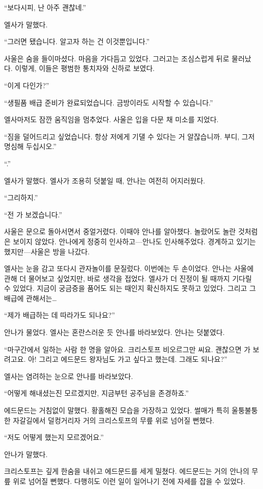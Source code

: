 ``보다시피, 난 아주 괜찮네.''

엘사가 말했다.

``그러면 됐습니다. 알고자 하는 건 이것뿐입니다.''

사울은 숨을 들이마셨다. 마음을 가다듬고 있었다. 그러고는 조심스럽게 뒤로 물러났다. 이렇게, 이들은 평범한 통치자와 신하로 보였다.

``이게 다인가?''

``생필품 배급 준비가 완료되었습니다. 금방이라도 시작할 수 있습니다.''

엘사마저도 잠깐 움직임을 멈추었다. 사울은 입을 다문 채 미소를 지었다.

``짐을 덜어드리고 싶었습니다. 항상 저에게 기댈 수 있다는 거 알잖습니까. 부디, 그저 명심해 두십시오.''

``.''

엘사가 말했다. 엘사가 조용히 덧붙일 때, 안나는 여전히 어지러웠다.

``그리하지.''

``전 가 보겠습니다.''

사울은 문으로 돌아서면서 중얼거렸다. 이때야 안나를 알아챘다. 놀랐어도 놀란 것처럼은 보이지 않았다. 안나에게 정중히 인사하고—안나도 인사해주었다. 경계하고 있기는 했지만—사울은 방을 나갔다.

엘사는 눈을 감고 또다시 관자놀이를 문질렀다. 이번에는 두 손이었다. 안나는 사울에 관해 더 물어보고 싶었지만, 바로 생각을 접었다. 엘사가 더 진정이 될 때까지 기다릴 수 있었다. 지금이 궁금증을 품어도 되는 때인지 확신하지도 못하고 있었다. 그리고 그 배급에 관해서는\ldots

``제가 배급하는 데 따라가도 되나요?''

안나가 물었다. 엘사는 혼란스러운 듯 안나를 바라보았다. 안나는 덧붙였다.

``마구간에서 일하는 사람 한 명을 알아요. 크리스토프 비오르그만 씨요. 괜찮으면 가 보려고요. 아! 그리고 에드문드 왕자님도 가고 싶다고 했는데. 그래도 되나요?''

엘사는 염려하는 눈으로 안나를 바라보았다.

\textbreak

\forceindent``어떻게 해내셨는진 모르겠지만, 지금부턴 공주님을 존경하죠.''

에드문드는 거침없이 말했다. 황홀해진 모습을 가장하고 있었다. 썰매가 특히 울퉁불퉁한 자갈길에서 덜컹거리자 거의 크리스토프의 무릎 위로 넘어질 뻔했다. 

``저도 어떻게 했는지 모르겠어요.''

안나가 말했다.

크리스토프는 깊게 한숨을 내쉬고 에드문드를 세게 밀쳤다. 에드문드는 거의 안나의 무릎 위로 넘어질 뻔했다. 다행히도 이런 일이 일어나기 전에 자세를 잡을 수 있었다.

